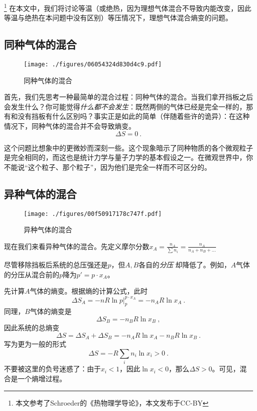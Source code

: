 

\footnote{本文参考了Schroeder的《热物理学导论》，本文发布于CC-BY} 在本文中，我们将讨论等温（或绝热，因为理想气体混合不导致内能改变，因此等温与绝热在本问题中没有区别）等压情况下，理想气体混合熵变的问题。

\subsection{同种气体的混合}
\begin{figure}[ht]
\centering
\texttt{[image: ./figures/06054324d830d4c9.pdf]}
\caption{同种气体的混合} \label{fig_IGME_1}
\end{figure}
首先，我们先思考一种最简单的混合过程：同种气体的混合。当我们拿开挡板之后会发生什么？你可能觉得\textsl{什么都不会发生}：既然两侧的气体已经是完全一样的，那有和没有挡板有什么区别吗？事实正是如此的简单（伴随着些许的诡异）：在这种情况下，同种气体的混合并不会导致熵变。
\begin{equation}
\Delta S = 0~.
\end{equation}

这个问题比想象中的更微妙而深刻一些。这个现象暗示了同种物质的各个微观粒子是完全相同的，而这也是统计力学与量子力学的基本假设之一。在微观世界中，你不能说“这个粒子、那个粒子”，因为他们是完全一样而不可区分的。

\subsection{异种气体的混合}
\begin{figure}[ht]
\centering
\texttt{[image: ./figures/00f50917178c747f.pdf]}
\caption{异种气体的混合} \label{fig_IGME_fig2}
\end{figure}

现在我们来看异种气体的混合。先定义摩尔分数$x_A = \frac{n_A}{\sum n_i} = \frac{n_A}{n_A+n_B+...}$

尽管移除挡板后系统的总压强还是$p$，但$A, B$各自的\textsl{分压} 却降低了。例如，$A$气体的分压从混合前的$p$降为$p'=p \cdot x_A$。

先计算$A$气体的熵变。根据熵的计算公式，此时
$$
\Delta S_A=-nR\ln p |^{p \cdot x_A}_p=-n_A R \ln x_A~.
$$
同理，$B$气体的熵变是
$$
\Delta S_B=-n_B R \ln x_B~,
$$
因此系统的总熵变
$$
\Delta S = \Delta S_A+\Delta S_B= -n_A R \ln x_A - n_B R \ln x_B~.
$$
写为更为一般的形式
\begin{equation}
\Delta S = -R \sum_i n_i \ln x_i >0~.
\end{equation}
不要被这里的负号迷惑了：由于$x_i<1$，因此$\ln x_i < 0$，那么$\Delta S>0$。可见，混合是一个熵增过程。

